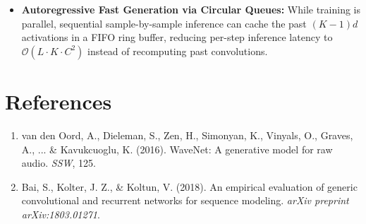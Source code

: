 \documentclass[11pt,a4paper]{article}
\theoremstyle{definition}
\begin{document}
\begin{itemize}
    \item \textbf{Autoregressive Fast Generation via Circular Queues:} While training is parallel, sequential sample-by-sample inference can cache the past $(K-1)d$ activations in a FIFO ring buffer, reducing per-step inference latency to $\mathcal{O}(L \cdot K \cdot C^2)$ instead of recomputing past convolutions.
\end{itemize}

\section{References}
\begin{enumerate}
    \item van den Oord, A., Dieleman, S., Zen, H., Simonyan, K., Vinyals, O., Graves, A., ... & Kavukcuoglu, K. (2016). WaveNet: A generative model for raw audio. \emph{SSW}, 125.
    \item Bai, S., Kolter, J. Z., & Koltun, V. (2018). An empirical evaluation of generic convolutional and recurrent networks for sequence modeling. \emph{arXiv preprint arXiv:1803.01271}.
\end{enumerate}
\end{document}
